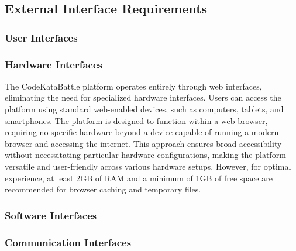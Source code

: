 \subsection{External Interface Requirements}

\subsubsection{User Interfaces}

\subsubsection{Hardware Interfaces}
The CodeKataBattle platform operates entirely through web interfaces, eliminating the need for specialized hardware interfaces. Users can access the platform using standard web-enabled devices, such as computers, tablets, and smartphones. The platform is designed to function within a web browser, requiring no specific hardware beyond a device capable of running a modern browser and accessing the internet. This approach ensures broad accessibility without necessitating particular hardware configurations, making the platform versatile and user-friendly across various hardware setups. However, for optimal experience, at least 2GB of RAM and a minimum of 1GB of free space are recommended for browser caching and temporary files.

\subsubsection{Software Interfaces}

\subsubsection{Communication Interfaces}

